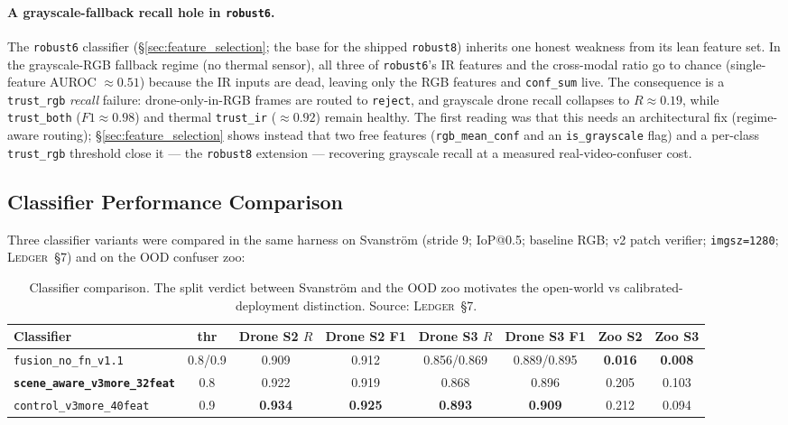 \documentclass[12pt,a4paper,oneside,openright]{book}
\begin{document}
\paragraph{A grayscale-fallback recall hole in \texttt{robust6}.}
The \texttt{robust6} classifier (\S\ref{sec:feature_selection}; the base for the shipped \texttt{robust8}) inherits one honest weakness from its lean feature set. In the grayscale-RGB fallback regime (no thermal sensor), all three of \texttt{robust6}'s IR features and the cross-modal ratio go to chance (single-feature AUROC $\approx 0.51$) because the IR inputs are dead, leaving only the RGB features and \texttt{conf\_sum} live. The consequence is a \texttt{trust\_rgb} \emph{recall} failure: drone-only-in-RGB frames are routed to \texttt{reject}, and grayscale drone recall collapses to $R\approx0.19$, while \texttt{trust\_both} ($F1\approx0.98$) and thermal \texttt{trust\_ir} ($\approx0.92$) remain healthy. The first reading was that this needs an architectural fix (regime-aware routing); \S\ref{sec:feature_selection} shows instead that two free features (\texttt{rgb\_mean\_conf} and an \texttt{is\_grayscale} flag) and a per-class \texttt{trust\_rgb} threshold close it --- the \texttt{robust8} extension --- recovering grayscale recall at a measured real-video-confuser cost.

\subsection{Classifier Performance Comparison}
\label{sec:classifier_compare}

Three classifier variants were compared in the same harness on Svanstr\"om (stride 9; IoP@0.5; baseline RGB; v2 patch verifier; \texttt{imgsz=1280}; \textsc{Ledger}~\S7) and on the OOD confuser zoo:

\begin{table}[htbp]
    \centering
    \caption{Classifier comparison. The split verdict between Svanstr\"om and the OOD zoo motivates the open-world vs calibrated-deployment distinction. Source: \textsc{Ledger}~\S7.}
    \label{tab:classifiers}
    \begin{tabular}{lccccccc}
        \toprule
        Classifier & thr & Drone S2 $R$ & Drone S2 F1 & Drone S3 $R$ & Drone S3 F1 & Zoo S2 & Zoo S3 \\
        \midrule
        \texttt{fusion\_no\_fn\_v1.1}        & 0.8/0.9 & 0.909 & 0.912 & 0.856/0.869 & 0.889/0.895 & \textbf{0.016} & \textbf{0.008} \\
        \textbf{\texttt{scene\_aware\_v3more\_32feat}} & 0.8 & 0.922 & 0.919 & 0.868 & 0.896 & 0.205 & 0.103 \\
        \texttt{control\_v3more\_40feat} & 0.9 & \textbf{0.934} & \textbf{0.925} & \textbf{0.893} & \textbf{0.909} & 0.212 & 0.094 \\
        \bottomrule
    \end{tabular}
\end{table}
\end{document}

